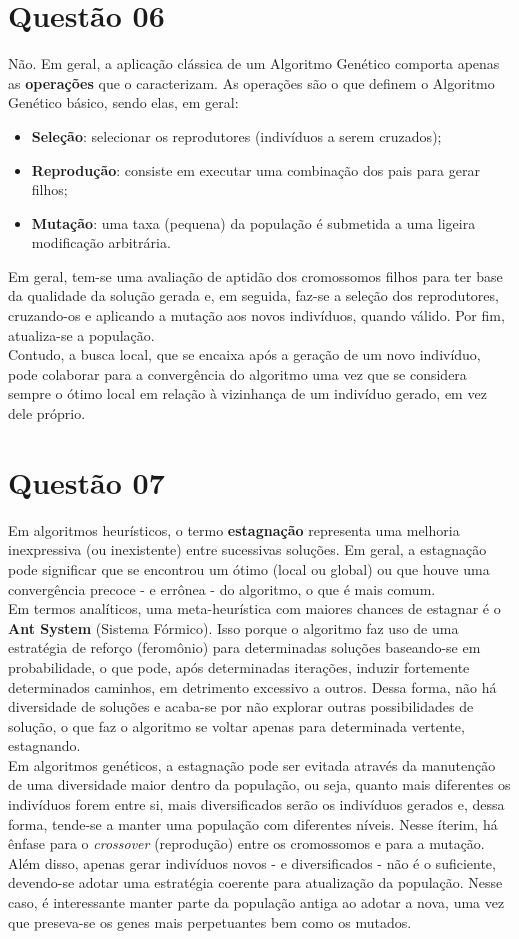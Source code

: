 	\section*{Questão 06}
	Não. Em geral, a aplicação clássica de um Algoritmo Genético comporta apenas as \textbf{operações} que o caracterizam. As operações são o que definem o Algoritmo Genético básico, sendo elas, em geral:
	\begin{itemize}
		\item \textbf{Seleção}: selecionar os reprodutores (indivíduos a serem cruzados);
		\item \textbf{Reprodução}: consiste em executar uma combinação dos pais para gerar filhos;
		\item \textbf{Mutação}: uma taxa (pequena) da população é submetida a uma ligeira modificação arbitrária.
	\end{itemize}
	Em geral, tem-se uma avaliação de aptidão dos cromossomos filhos para ter base da qualidade da solução gerada e, em seguida, faz-se a seleção dos reprodutores, cruzando-os e aplicando a mutação aos novos indivíduos, quando válido. Por fim, atualiza-se a população.\\
	Contudo, a busca local, que se encaixa após a geração de um novo indivíduo, pode colaborar para a convergência do algoritmo uma vez que se considera sempre o ótimo local em relação à vizinhança de um indivíduo gerado, em vez dele próprio.

	\section*{Questão 07}
	Em algoritmos heurísticos, o termo \textbf{estagnação} representa uma melhoria inexpressiva (ou inexistente) entre sucessivas soluções. Em geral, a estagnação pode significar que se encontrou um ótimo (local ou global) ou que houve uma convergência precoce - e errônea - do algoritmo, o que é mais comum.\\
	Em termos analíticos, uma meta-heurística com maiores chances de estagnar é o \textbf{Ant System} (Sistema Fórmico). Isso porque o algoritmo faz uso de uma estratégia de reforço (feromônio) para determinadas soluções baseando-se em probabilidade, o que pode, após determinadas iterações, induzir fortemente determinados caminhos, em detrimento excessivo a outros. Dessa forma, não há diversidade de soluções e acaba-se por não explorar outras possibilidades de solução, o que faz o algoritmo se voltar apenas para determinada vertente, estagnando.\\
	Em algoritmos genéticos, a estagnação pode ser evitada através da manutenção de uma diversidade maior dentro da população, ou seja, quanto mais diferentes os indivíduos forem entre si, mais diversificados serão os indivíduos gerados e, dessa forma, tende-se a manter uma população com diferentes níveis. Nesse íterim, há ênfase para o \textit{crossover} (reprodução) entre os cromossomos e para a mutação. Além disso, apenas gerar indivíduos novos - e diversificados - não é o suficiente, devendo-se adotar uma estratégia coerente para atualização da população. Nesse caso, é interessante manter parte da população antiga ao adotar a nova, uma vez que preseva-se os genes mais perpetuantes bem como os mutados.

